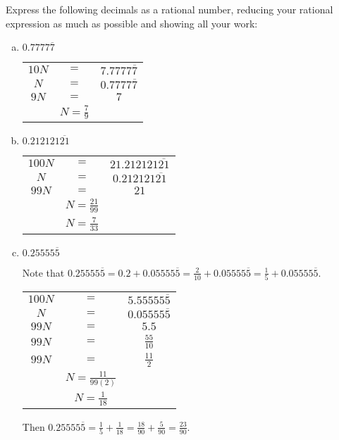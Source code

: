 \documentclass[11pt,letterpaper]{article}
\begin{document}
 Express the following decimals as a rational number, reducing your rational expression as much as possible and showing all your work:
{\itshape\small
\begin{enumerate}[(a)]
\item $0.7777\overline{7}$ 
	\begin{table}[!ht]
	\centering\small
	\begin{tabular}{ccc}
	$10N$ & $=$ & $7.7777\overline{7}$ \\ 
	$N$ & $=$ & $0.7777\overline{7}$ \\ \hline
	$9N$ & $=$ & $7$ \\
	& $N= \frac{7}{9}$ & 
	\end{tabular}
	\end{table}
	

\item $0.212121\overline{21}$ 
	\begin{table}[!ht]
	\centering\small
	\begin{tabular}{ccc}
	$100N$ & $=$ & $21.212121\overline{21}$ \\ 
	$N$ & $=$ & $0.212121\overline{21}$ \\ \hline
	$99N$ & $=$ & $21$ \\
	& $N= \frac{21}{99}$ & \\[0.1cm]
	& $N= \frac{7}{33}$ & 
	\end{tabular}
	\end{table}

\item $0.25555\overline{5}$ \pspace

Note that $0.25555\overline{5}= 0.2 + 0.05555\overline{5}= \frac{2}{10} + 0.05555\overline{5}= \frac{1}{5} + 0.05555\overline{5}$. 
	\begin{table}[!ht]
	\centering\small
	\begin{tabular}{ccc}
	$100N$ & $=$ & $5.55555\overline{5}$ \\ 
	$N$ & $=$ & $0.05555\overline{5}$ \\ \hline
	$99N$ & $=$ & $5.5$ \\
	$99N$ & $=$ & $\frac{55}{10}$ \\
	$99N$ & $=$ & $\frac{11}{2}$ \\
	& $N= \frac{11}{99(2)}$ & \\[0.1cm]
	& $N= \frac{1}{18}$ & 
	\end{tabular}
	\end{table} \par
Then $0.25555\overline{5}= \frac{1}{5} + \frac{1}{18}= \frac{18}{90} + \frac{5}{90}= \frac{23}{90}$.
\end{enumerate}
}
\end{document}
